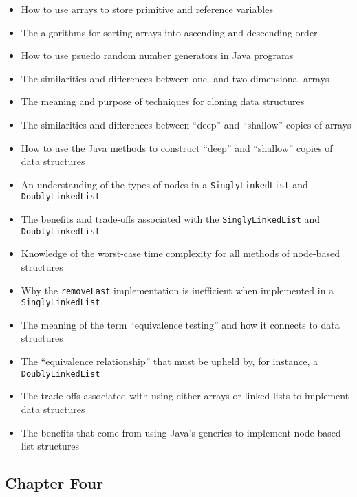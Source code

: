 \documentclass[11pt]{article}
\newcommand{\program}[1]{\lstinline{#1}}
\begin{document}
\begin{itemize}

  \setlength{\itemsep}{0.05in}

  \item How to use arrays to store primitive and reference variables
  \item The algorithms for sorting arrays into ascending and descending order
  \item How to use psuedo random number generators in Java programs
  \item The similarities and differences between one- and two-dimensional arrays
  \item The meaning and purpose of techniques for cloning data structures
  \item The similarities and differences between ``deep'' and ``shallow'' copies
    of arrays
  \item How to use the Java methods to construct ``deep'' and ``shallow'' copies
    of data structures
  \item An understanding of the types of nodes in a \program{SinglyLinkedList} and \program{DoublyLinkedList}
  \item The benefits and trade-offs associated with the \program{SinglyLinkedList} and \program{DoublyLinkedList}
  \item Knowledge of the worst-case time complexity for all methods of node-based structures
  \item Why the \program{removeLast} implementation is inefficient when
    implemented in a \program{SinglyLinkedList}
  \item The meaning of the term ``equivalence testing'' and how it connects to data structures
  \item The ``equivalence relationship'' that must be upheld by, for instance, a \program{DoublyLinkedList}
  \item The trade-offs associated with using either arrays or linked lists to implement data structures
  \item The benefits that come from using Java's generics to implement node-based list
    structures

\end{itemize}

\vspace*{-.2in}
\subsection*{Chapter Four}
\end{document}
